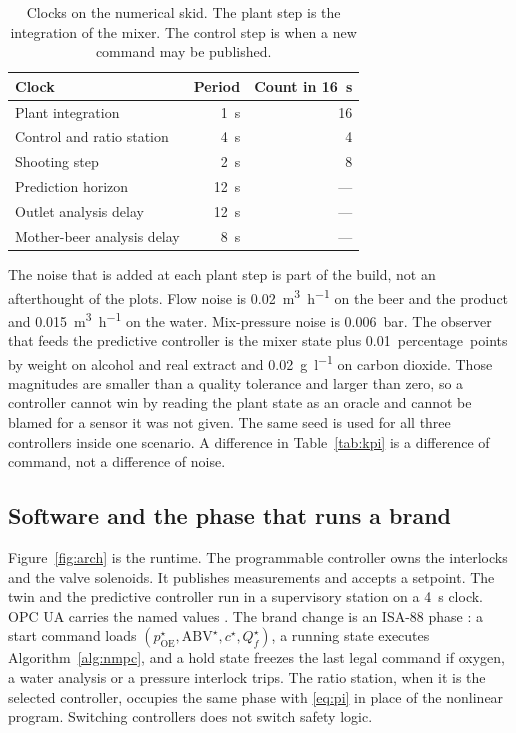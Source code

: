 \begin{table}[htbp]
\centering
\caption{Clocks on the numerical skid. The plant step is the integration of the mixer. The control step is when a new command may be published.}
\label{tab:clocks}
\begin{tabular}{lrr}\toprule
Clock & Period & Count in \SI{16}{\second} \\\midrule
Plant integration & \SI{1}{\second} & 16 \\
Control and ratio station & \SI{4}{\second} & 4 \\
Shooting step & \SI{2}{\second} & 8 \\
Prediction horizon & \SI{12}{\second} & --- \\
Outlet analysis delay & \SI{12}{\second} & --- \\
Mother-beer analysis delay & \SI{8}{\second} & --- \\
\bottomrule\end{tabular}
\end{table}

The noise that is added at each plant step is part of the build, not an afterthought of the plots. Flow noise is \SI{0.02}{\cubic\metre\per\hour} on the beer and the product and \SI{0.015}{\cubic\metre\per\hour} on the water. Mix-pressure noise is \SI{0.006}{bar}. The observer that feeds the predictive controller is the mixer state plus \SI{0.01}{percentage points} by weight on alcohol and real extract and \SI{0.02}{\gram\per\litre} on carbon dioxide. Those magnitudes are smaller than a quality tolerance and larger than zero, so a controller cannot win by reading the plant state as an oracle and cannot be blamed for a sensor it was not given. The same seed is used for all three controllers inside one scenario. A difference in Table~\ref{tab:kpi} is a difference of command, not a difference of noise.

\subsection{Software and the phase that runs a brand}

Figure~\ref{fig:arch} is the runtime. The programmable controller owns the interlocks and the valve solenoids. It publishes measurements and accepts a setpoint. The twin and the predictive controller run in a supervisory station on a \SI{4}{\second} clock. OPC UA carries the named values \citep{iec62541}. The brand change is an ISA-88 phase \citep{isa88}: a start command loads $(p_{\mathrm{OE}}^{\star},\mathrm{ABV}^{\star},c^{\star},Q_f^{\star})$, a running state executes Algorithm~\ref{alg:nmpc}, and a hold state freezes the last legal command if oxygen, a water analysis or a pressure interlock trips. The ratio station, when it is the selected controller, occupies the same phase with \eqref{eq:pi} in place of the nonlinear program. Switching controllers does not switch safety logic.

